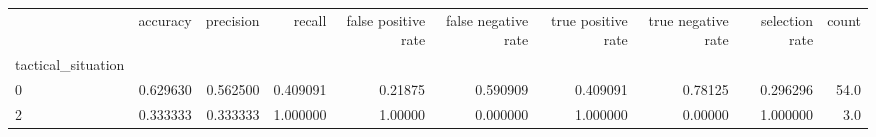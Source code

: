 \begin{tabular}{lrrrrrrrrr}
\toprule
{} &  accuracy &  precision &    recall &  false positive rate &  false negative rate &  true positive rate &  true negative rate &  selection rate &  count \\
tactical\_situation &           &            &           &                      &                      &                     &                     &                 &        \\
\midrule
0                  &  0.629630 &   0.562500 &  0.409091 &              0.21875 &             0.590909 &            0.409091 &             0.78125 &        0.296296 &   54.0 \\
2                  &  0.333333 &   0.333333 &  1.000000 &              1.00000 &             0.000000 &            1.000000 &             0.00000 &        1.000000 &    3.0 \\
\bottomrule
\end{tabular}
